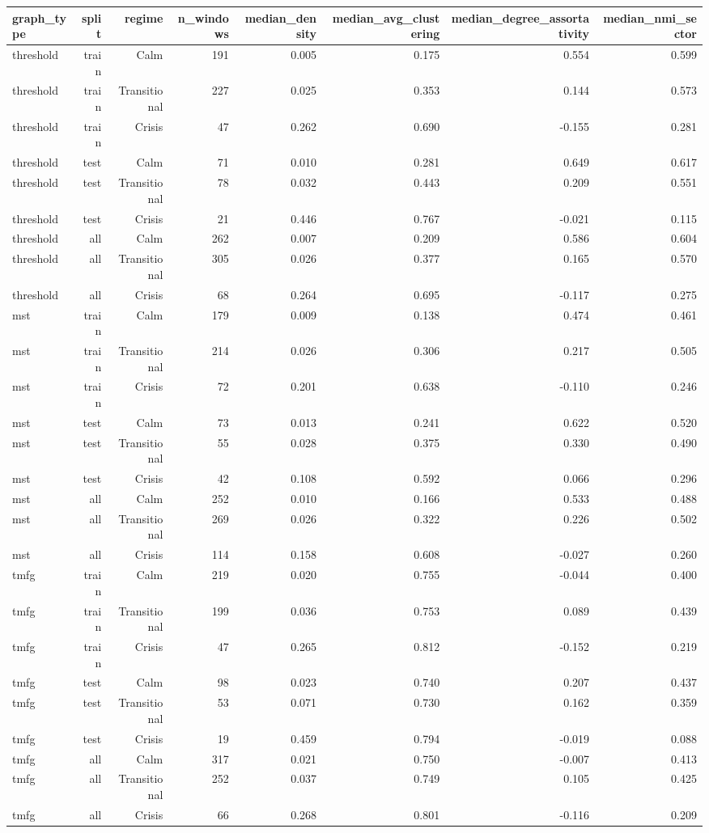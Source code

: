 \begin{tabular}{lrrrrrrr}
\toprule
graph\_type & split & regime & n\_windows & median\_density & median\_avg\_clustering & median\_degree\_assortativity & median\_nmi\_sector \\
\midrule
threshold & train & Calm & 191 & 0.005 & 0.175 & 0.554 & 0.599 \\
threshold & train & Transitional & 227 & 0.025 & 0.353 & 0.144 & 0.573 \\
threshold & train & Crisis & 47 & 0.262 & 0.690 & -0.155 & 0.281 \\
threshold & test & Calm & 71 & 0.010 & 0.281 & 0.649 & 0.617 \\
threshold & test & Transitional & 78 & 0.032 & 0.443 & 0.209 & 0.551 \\
threshold & test & Crisis & 21 & 0.446 & 0.767 & -0.021 & 0.115 \\
threshold & all & Calm & 262 & 0.007 & 0.209 & 0.586 & 0.604 \\
threshold & all & Transitional & 305 & 0.026 & 0.377 & 0.165 & 0.570 \\
threshold & all & Crisis & 68 & 0.264 & 0.695 & -0.117 & 0.275 \\
mst & train & Calm & 179 & 0.009 & 0.138 & 0.474 & 0.461 \\
mst & train & Transitional & 214 & 0.026 & 0.306 & 0.217 & 0.505 \\
mst & train & Crisis & 72 & 0.201 & 0.638 & -0.110 & 0.246 \\
mst & test & Calm & 73 & 0.013 & 0.241 & 0.622 & 0.520 \\
mst & test & Transitional & 55 & 0.028 & 0.375 & 0.330 & 0.490 \\
mst & test & Crisis & 42 & 0.108 & 0.592 & 0.066 & 0.296 \\
mst & all & Calm & 252 & 0.010 & 0.166 & 0.533 & 0.488 \\
mst & all & Transitional & 269 & 0.026 & 0.322 & 0.226 & 0.502 \\
mst & all & Crisis & 114 & 0.158 & 0.608 & -0.027 & 0.260 \\
tmfg & train & Calm & 219 & 0.020 & 0.755 & -0.044 & 0.400 \\
tmfg & train & Transitional & 199 & 0.036 & 0.753 & 0.089 & 0.439 \\
tmfg & train & Crisis & 47 & 0.265 & 0.812 & -0.152 & 0.219 \\
tmfg & test & Calm & 98 & 0.023 & 0.740 & 0.207 & 0.437 \\
tmfg & test & Transitional & 53 & 0.071 & 0.730 & 0.162 & 0.359 \\
tmfg & test & Crisis & 19 & 0.459 & 0.794 & -0.019 & 0.088 \\
tmfg & all & Calm & 317 & 0.021 & 0.750 & -0.007 & 0.413 \\
tmfg & all & Transitional & 252 & 0.037 & 0.749 & 0.105 & 0.425 \\
tmfg & all & Crisis & 66 & 0.268 & 0.801 & -0.116 & 0.209 \\
\bottomrule
\end{tabular}

